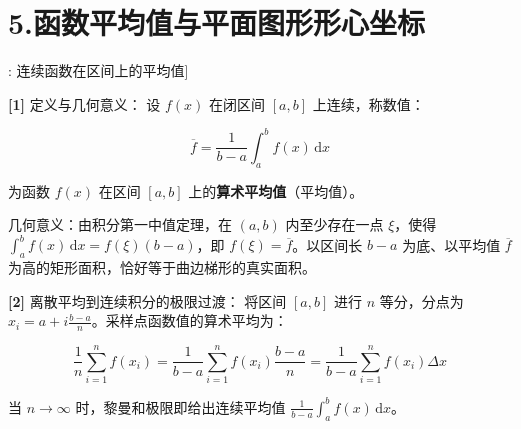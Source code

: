 \documentclass[11pt,a4paper,UTF8]{ctexart}
\begin{document}
\section{5.函数平均值与平面图形形心坐标}

\begin{thmbox}[公式[8]: 连续函数在区间上的平均值]

\textbf{[1]} 定义与几何意义：
设 $f(x)$ 在闭区间 $[a, b]$ 上连续，称数值：


\begin{equation*}
\overline{f} = \frac{1}{b-a}\int_a^b f(x)\,\mathrm{d}x
\end{equation*}


为函数 $f(x)$ 在区间 $[a, b]$ 上的\textbf{算术平均值}（平均值）。

几何意义：由积分第一中值定理，在 $(a, b)$ 内至少存在一点 $\xi$，使得 $\int_a^b f(x)\,\mathrm{d}x = f(\xi)(b-a)$，即 $f(\xi) = \overline{f}$。以区间长 $b-a$ 为底、以平均值 $\overline{f}$ 为高的矩形面积，恰好等于曲边梯形的真实面积。

\textbf{[2]} 离散平均到连续积分的极限过渡：
将区间 $[a, b]$ 进行 $n$ 等分，分点为 $x_i = a + i\frac{b-a}{n}$。采样点函数值的算术平均为：


\begin{equation*}
\frac{1}{n}\sum_{i=1}^n f(x_i) = \frac{1}{b-a}\sum_{i=1}^n f(x_i)\frac{b-a}{n} = \frac{1}{b-a}\sum_{i=1}^n f(x_i)\Delta x
\end{equation*}


当 $n \to \infty$ 时，黎曼和极限即给出连续平均值 $\frac{1}{b-a}\int_a^b f(x)\,\mathrm{d}x$。

\end{thmbox}
\end{document}
